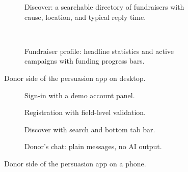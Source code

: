 \begin{figure}[htbp]
  \centering
  \begin{subfigure}[b]{0.8\textwidth}
    \centering
    \caption{Discover: a searchable directory of fundraisers with cause, location, and typical reply time.}
    \label{fig:ui-donor-discover}
  \end{subfigure}
  \\[8pt]
  \begin{subfigure}[b]{0.8\textwidth}
    \centering
    \caption{Fundraiser profile: headline statistics and active campaigns with funding progress bars.}
    \label{fig:ui-donor-profile}
  \end{subfigure}
  \caption{Donor side of the persuasion app on desktop.}
  \label{fig:ui-donor-desktop}
\end{figure}

\begin{figure}[htbp]
  \centering
  \begin{subfigure}[t]{0.235\textwidth}
    \centering
    \caption{Sign-in with a demo account panel.}
  \end{subfigure}
  \hfill
  \begin{subfigure}[t]{0.235\textwidth}
    \centering
    \caption{Registration with field-level validation.}
  \end{subfigure}
  \hfill
  \begin{subfigure}[t]{0.235\textwidth}
    \centering
    \caption{Discover with search and bottom tab bar.}
  \end{subfigure}
  \hfill
  \begin{subfigure}[t]{0.235\textwidth}
    \centering
    \caption{Donor's chat: plain messages, no AI output.}
  \end{subfigure}
  \caption{Donor side of the persuasion app on a phone.}
  \label{fig:ui-donor-mobile}
\end{figure}

